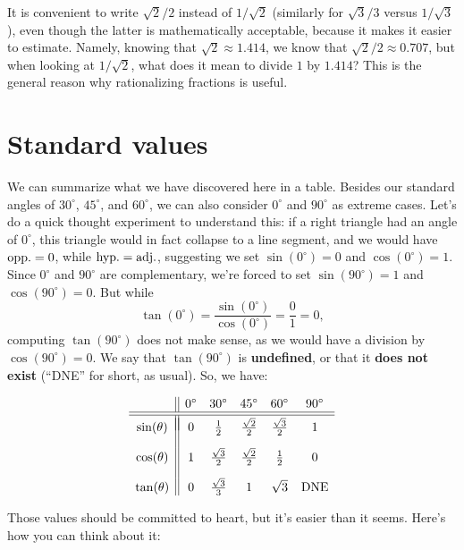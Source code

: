 \documentclass{ximera}
\begin{document}
\begin{remark}
  It is convenient to write $\sqrt{2}/2$ instead of $1/\sqrt{2}$ (similarly for $\sqrt{3}/3$ versus $1/\sqrt{3}$), even though the latter is mathematically acceptable, because it makes it easier to estimate. Namely, knowing that $\sqrt{2} \approx 1.414$, we know that $\sqrt{2}/2 \approx 0.707$, but when looking at $1/\sqrt{2}$, what does it mean to divide $1$ by $1.414$? This is the general reason why rationalizing fractions is useful.
\end{remark}


\section{Standard values}

We can summarize what we have discovered here in a table. Besides our standard angles of $30^\circ$, $45^\circ$, and $60^\circ$, we can also consider $0^\circ$ and $90^\circ$ as extreme cases. Let's do a quick thought experiment to understand this: if a right triangle had an angle of $0^\circ$, this triangle would in fact collapse to a line segment, and we would have ${\rm opp.} = 0$, while ${\rm hyp}. = {\rm adj}.$, suggesting we set $\sin(0^\circ) = 0$ and $\cos(0^\circ) = 1$. Since $0^\circ$ and $90^\circ$ are complementary, we're forced to set $\sin(90^\circ) = 1$ and $\cos(90^\circ) = 0$. But while $$\tan(0^\circ) = \frac{\sin(0^\circ)}{\cos(0^\circ)} = \frac{0}{1} = 0,$$computing $\tan(90^\circ)$ does not make sense, as we would have a division by $\cos(90^\circ) = 0$. We say that $\tan(90^ \circ)$ is {\bf undefined}, or that it {\bf does not exist} (``DNE'' for short, as usual). So, we have:

$$
\begin{array}{c||ccccc}
 & 0^\circ & 30^\circ & 45^\circ & 60^\circ & 90^\circ \\
\hline\hline \\[-1em]  
\sin(\theta) & 0 & \frac{1}{2} & \frac{\sqrt{2}}{2} & \frac{\sqrt{3}}{2} & 1 \\[1em]
 \cos(\theta) & 1 & \frac{\sqrt{3}}{2} & \frac{\sqrt{2}}{2} & \frac{1}{2} & 0 \\[1em]
\tan(\theta)& 0 & \frac{\sqrt{3}}{3} & 1 & \sqrt{3} & {\rm DNE}
\end{array}
$$

Those values should be committed to heart, but it's easier than it seems. Here's how you can think about it:
\end{document}
